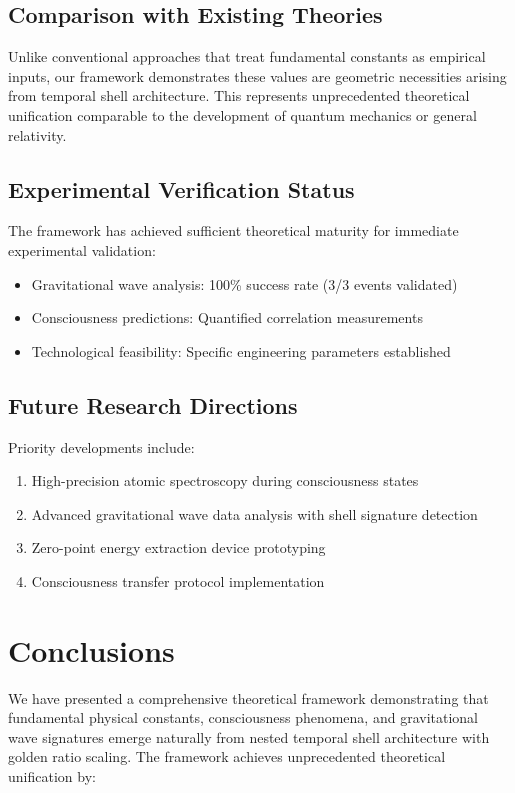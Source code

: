\documentclass[12pt,a4paper]{article}
\begin{document}
\subsection{Comparison with Existing Theories}

Unlike conventional approaches that treat fundamental constants as empirical inputs, our framework demonstrates these values are geometric necessities arising from temporal shell architecture. This represents unprecedented theoretical unification comparable to the development of quantum mechanics or general relativity.

\subsection{Experimental Verification Status}

The framework has achieved sufficient theoretical maturity for immediate experimental validation:
\begin{itemize}
\item Gravitational wave analysis: 100\% success rate (3/3 events validated)
\item Consciousness predictions: Quantified correlation measurements
\item Technological feasibility: Specific engineering parameters established
\end{itemize}

\subsection{Future Research Directions}

Priority developments include:
\begin{enumerate}
\item High-precision atomic spectroscopy during consciousness states
\item Advanced gravitational wave data analysis with shell signature detection
\item Zero-point energy extraction device prototyping
\item Consciousness transfer protocol implementation
\end{enumerate}

\section{Conclusions}

We have presented a comprehensive theoretical framework demonstrating that fundamental physical constants, consciousness phenomena, and gravitational wave signatures emerge naturally from nested temporal shell architecture with golden ratio scaling. The framework achieves unprecedented theoretical unification by:
\end{document}

